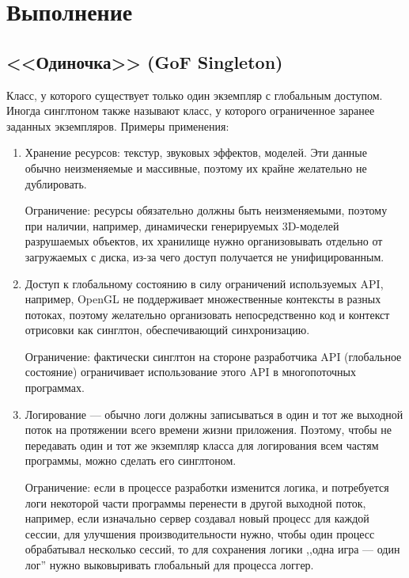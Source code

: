 \section*{Выполнение}

\subsection*{<<Одиночка>> (GoF Singleton)}
Класс, у которого существует только один экземпляр с глобальным доступом.
Иногда синглтоном также называют класс, у которого ограниченное заранее заданных экземпляров.
Примеры применения:
\begin{enumerate}
    \item Хранение ресурсов: текстур, звуковых эффектов, моделей.
    Эти данные обычно неизменяемые и массивные, поэтому их крайне желательно не дублировать.

    Ограничение: ресурсы обязательно должны быть неизменяемыми,
    поэтому при наличии, например, динамически генерируемых 3D-моделей разрушаемых объектов,
    их хранилище нужно организовывать отдельно от загружаемых с диска,
    из-за чего доступ получается не унифицированным.

    \item Доступ к глобальному состоянию в силу ограничений используемых API,
    например, OpenGL не поддерживает множественные контексты в разных потоках,
    поэтому желательно организовать непосредственно код и контекст отрисовки как синглтон,
    обеспечивающий синхронизацию.

    Ограничение: фактически синглтон на стороне разработчика API (глобальное состояние)
    ограничивает использование этого API в многопоточных программах.

    \item Логирование --- обычно логи должны записываться в один и тот же выходной поток на протяжении всего
    времени жизни приложения.
    Поэтому, чтобы не передавать один и тот же экземпляр класса для логирования всем частям программы,
    можно сделать его синглтоном.

    Ограничение: если в процессе разработки изменится логика,
    и потребуется логи некоторой части программы перенести в другой выходной поток,
    например, если изначально сервер создавал новый процесс для каждой сессии,
    для улучшения производительности нужно, чтобы один процесс обрабатывал несколько сессий,
    то для сохранения логики ,,одна игра --- один лог'' нужно выковыривать глобальный для процесса логгер.
\end{enumerate}


